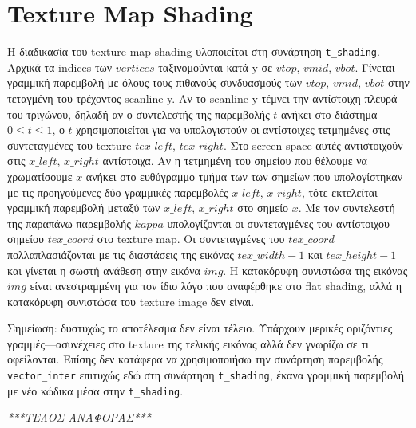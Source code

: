 \documentclass{article}
\begin{document}
\section{Texture Map Shading}
Η διαδικασία του texture map shading υλοποιείται στη συνάρτηση 
\verb|t_shading|.
Αρχικά τα indices των $vertices$ ταξινομούνται κατά y σε $vtop$,
$vmid$, $vbot$.
Γίνεται γραμμική παρεμβολή με όλους τους πιθανούς συνδυασμούς των $vtop$,
$vmid$, $vbot$ στην τεταγμένη του τρέχοντος scanline y. Αν το scanline y τέμνει την 
αντίστοιχη πλευρά του τριγώνου, δηλαδή αν ο συντελεστής της παρεμβολής $t$ ανήκει στο διάστημα
$0 \leq t \leq 1$, ο $t$ χρησιμοποιείται για να υπολογιστούν οι αντίστοιχες 
τετμημένες στις συντεταγμένες του texture $tex\_left$, $tex\_right$. Στο
screen space αυτές αντιστοιχούν στις $x\_left$, $x\_right$ αντίστοιχα.
Αν η τετμημένη του σημείου που θέλουμε να χρωματίσουμε $x$ ανήκει στο ευθύγραμμο
τμήμα των των σημείων που υπολογίστηκαν με τις προηγούμενες δύο 
γραμμικές παρεμβολές $x\_left$, $x\_right$, τότε εκτελείται γραμμική παρεμβολή
μεταξύ των $x\_left$, $x\_right$ στο σημείο $x$. Με τον συντελεστή της παραπάνω 
πα\-ρεμ\-βολής $kappa$ υπολογίζονται οι συντεταγμένες του αντίστοιχου σημείου 
$tex\_coord$ στο texture map. Οι συν\-τε\-ταγμένες του $tex\_coord$ πολλαπλασιάζονται 
με τις διαστάσεις της εικόνας $tex\_width - 1$ και $tex\_height - 1$ και γίνεται η 
σωστή ανάθεση στην εικόνα $img$. Η κατακόρυφη συνιστώσα της εικόνας $img$ είναι 
ανεστραμμένη για τον ίδιο λόγο που αναφέρθηκε στο flat shading, αλλά
η κατακόρυφη συνιστώσα του texture image δεν είναι.

Σημείωση: δυστυχώς το αποτέλεσμα δεν είναι τέλειο. Υπάρχουν μερικές
οριζόντιες γραμμές---ασυνέ\-χειες στο texture της τελικής εικόνας αλλά δεν γνωρίζω
σε τι οφείλονται. Επίσης δεν κατάφερα να 
χρησιμοποιήσω την συνάρτηση παρεμβολής \verb|vector_inter| επιτυχώς εδώ στη 
συνάρτηση \verb|t_shading|, έκα\-να γραμμική παρεμβολή με νέο κώδικα μέσα
στην \verb|t_shading|.


\vspace{2em}
\centering
\emph{***ΤΕΛΟΣ ΑΝΑΦΟΡΑΣ***}
\end{document}
